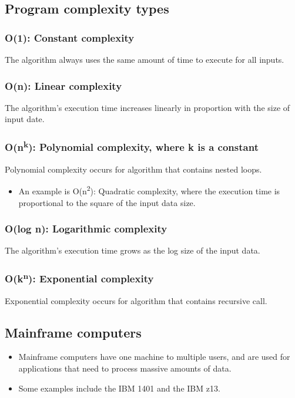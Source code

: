 \documentclass[11pt]{article}
\begin{document}
\subsection{Program complexity types}
\label{sec:orgf9f89b2}

\subsubsection{O(1): Constant complexity}
\label{sec:orgbc0d5d9}
The algorithm always uses the same amount of time to execute for all inputs.

\subsubsection{O(n): Linear complexity}
\label{sec:org0a14894}
The algorithm's execution time increases linearly in proportion with the size of input date.

\subsubsection{O(n\textsuperscript{k}): Polynomial complexity, where k is a constant}
\label{sec:orga454d5a}
Polynomial complexity occurs for algorithm that contains nested loops.
\begin{itemize}
\item An example is O(n\textsuperscript{2}): Quadratic complexity, where the execution time is proportional to the square of the input data size.
\end{itemize}

\subsubsection{O(log n): Logarithmic complexity}
\label{sec:org9c4c5ea}
The algorithm's execution time grows as the log size of the input data.

\subsubsection{O(k\textsuperscript{n}): Exponential complexity}
\label{sec:org966d259}
Exponential complexity occurs for algorithm that contains recursive call.

\subsection{Mainframe computers}
\label{sec:org1589926}
\begin{itemize}
\item Mainframe computers have one machine to multiple users, and are used for applications that need to process massive amounts of data.
\item Some examples include the IBM 1401 and the IBM z13.
\end{itemize}
\end{document}
